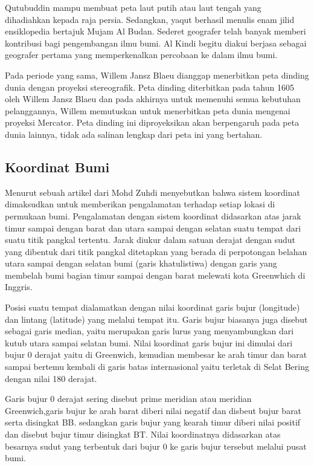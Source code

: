 \begin{enumerate}
Qutubuddin mampu membuat peta laut putih atau laut tengah yang dihadiahkan kepada raja persia. Sedangkan, yaqut berhasil menulis enam jilid ensiklopedia bertajuk Mujam Al Budan. Sederet geografer telah banyak memberi kontribusi bagi pengembangan ilmu bumi. Al Kindi begitu diakui berjasa sebagai geografer pertama yang memperkenalkan percobaan ke dalam ilmu bumi.

Pada periode yang sama, Willem Jansz Blaeu dianggap menerbitkan peta dinding dunia dengan proyeksi stereografik. Peta dinding diterbitkan pada tahun 1605 oleh Willem Jansz Blaeu dan pada akhirnya untuk memenuhi semua kebutuhan pelanggannya, Willem memutuskan untuk menerbitkan peta dunia mengenai proyeksi Mercator. Peta dinding ini diproyeksikan akan berpengaruh pada peta dunia lainnya, tidak ada salinan lengkap dari peta ini yang bertahan.
\end{enumerate}

\subsection{Koordinat Bumi}
Menurut sebuah artikel dari Mohd Zuhdi menyebutkan bahwa sistem koordinat dimaksudkan untuk memberikan pengalamatan terhadap setiap lokasi di permukaan bumi. Pengalamatan dengan sistem koordinat didasarkan atas jarak timur sampai dengan barat dan utara sampai dengan selatan suatu tempat dari suatu titik pangkal tertentu. Jarak diukur dalam satuan derajat dengan sudut yang dibentuk dari titik pangkal ditetapkan yang berada di perpotongan belahan utara sampai dengan selatan bumi (garis khatulistiwa) dengan garis yang membelah bumi bagian timur sampai dengan barat melewati kota Greenwhich di Inggris.

Posisi suatu tempat dialamatkan dengan nilai koordinat garis bujur (longitude) dan lintang (latitude) yang melalui tempat itu. Garis bujur biasanya juga disebut sebagai garis median, yaitu merupakan garis lurus yang menyambungkan dari kutub utara sampai selatan bumi. Nilai koordinat garis bujur ini dimulai dari bujur 0 derajat yaitu di Greenwich, kemudian membesar ke arah timur dan barat sampai bertemu kembali di garis batas internasional yaitu terletak di Selat Bering dengan nilai 180 derajat.

Garis bujur 0 derajat sering disebut prime meridian atau meridian Greenwich,garis bujur ke arah barat diberi nilai negatif dan disbeut bujur barat serta disingkat BB. sedangkan garis bujur yang kearah timur diberi nilai positif dan disebut bujur timur disingkat BT. Nilai koordinatnya didasarkan atas besarnya sudut yang terbentuk dari bujur 0 ke garis bujur tersebut melalui pusat bumi.

